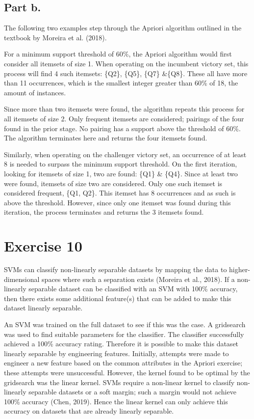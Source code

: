 \documentclass[11pt, a4paper]{article}
\begin{document}
\subsection{Part b.}

The following two examples step through the Apriori algorithm outlined in the textbook by Moreira et al. (2018).

For a minimum support threshold of 60\%, the Apriori algorithm would first consider all itemsets of size 1. When operating on the incumbent victory set, this process will find 4 such itemsets: \{Q2\}, \{Q5\}, \{Q7\} \&\{Q8\}. These all have more than 11 occurrences, which is the smallest integer greater than 60\% of 18, the amount of instances.

Since more than two itemsets were found, the algorithm repeats this process for all itemsets of size 2. Only frequent itemsets are considered; pairings of the four found in the prior stage. No pairing has a support above the threshold of 60\%. The algorithm terminates here and returns the four itemsets found.

Similarly, when operating on the challenger victory set, an occurrence of at least 8 is needed to surpass the minimum support threshold. On the first iteration, looking for itemsets of size 1, two are found: \{Q1\} \& \{Q4\}. Since at least two were found, itemsets of size two are considered. Only one such itemset is considered frequent, \{Q1, Q2\}. This itemset has 8 occurrences and as such is above the threshold. However, since only one itemset was found during this iteration, the process terminates and returns the 3 itemsets found.

\section{Exercise 10}

SVMs can classify non-linearly separable datasets by mapping the data to higher-dimensional spaces where such a separation exists (Moreira et al., 2018). If a non-linearly separable dataset can be classified with an SVM with 100\% accuracy, then there exists some additional feature(s) that can be added to make this dataset linearly separable.

An SVM was trained on the full dataset to see if this was the case. A gridsearch was used to find suitable parameters for the classifier. The classifier successfully achieved a 100\% accuracy rating. Therefore it is possible to make this dataset linearly separable by engineering features. Initially, attempts were made to engineer a new feature based on the common attributes in the Apriori exercise; these attempts were unsuccessful. However, the kernel found to be optimal by the gridsearch was the linear kernel. SVMs require a non-linear kernel to classify non-linearly separable datasets or a soft margin; such a margin  would not achieve 100\% accuracy (Chen, 2019). Hence the linear kernel can only achieve this accuracy on datasets that are already linearly separable.
\end{document}
